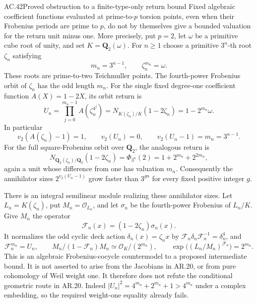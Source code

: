\begin{claim}{AC.42}{Proved obstruction to a finite-type-only return bound}
Fixed algebraic coefficient functions evaluated at prime-to-$p$ torsion
points, even when their Frobenius periods are prime to $p$, do not by
themselves give a bounded valuation for the return unit minus one.
More precisely, put $p=2$, let $\omega$ be a primitive cube root of
unity, and set $K=\mathbf Q_2(\omega)$. For $n\ge1$ choose a primitive
$3^n$-th root $\zeta_n$ satisfying
\[
 m_n=3^{n-1},\qquad \zeta_n^{m_n}=\omega.
\]
These roots are prime-to-two Teichmuller points. The fourth-power
Frobenius orbit of $\zeta_n$ has the odd length $m_n$. For the single
fixed degree-one coefficient function $A(X)=1-2X$, its orbit return is
\[
 U_n=\prod_{j=0}^{m_n-1}A(\zeta_n^{4^j})
     =N_{K(\zeta_n)/K}(1-2\zeta_n)
     =1-2^{m_n}\omega.                              \tag{AC.42.1}
\]
In particular
\[
 v_2(A(\zeta_n)-1)=1,\qquad v_2(U_n)=0,
 \qquad v_2(U_n-1)=m_n=3^{n-1}.                    \tag{AC.42.2}
\]
For the full square-Frobenius orbit over $\mathbf Q_2$, the analogous
return is
\[
 N_{\mathbf Q_2(\zeta_n)/\mathbf Q_2}(1-2\zeta_n)
 =\Phi_{3^n}(2)=1+2^{m_n}+2^{2m_n},                 \tag{AC.42.3}
\]
again a unit whose difference from one has valuation $m_n$.
Consequently the annihilator sizes $2^{v_2(U_n-1)}$ grow faster than
$3^{gn}$ for every fixed positive integer $g$.

There is an integral semilinear module realizing these annihilator
sizes. Let $L_n=K(\zeta_n)$, put $M_n=\mathcal O_{L_n}$, and let
$\sigma_n$ be the fourth-power Frobenius of $L_n/K$. Give $M_n$ the
operator
\[
 \mathcal F_n(x)=(1-2\zeta_n)\sigma_n(x).
\]
It normalizes the odd cyclic deck action $\delta_n(x)=\zeta_nx$ by
$\mathcal F_n\delta_n\mathcal F_n^{-1}=\delta_n^4$, and
\[
 \mathcal F_n^{m_n}=U_n,\qquad
 M_n/(1-\mathcal F_n)M_n
       \simeq\mathcal O_K/(2^{m_n}),\qquad
 \exp\bigl((L_n/M_n)^{\mathcal F_n}\bigr)=2^{m_n}.
                                                        \tag{AC.42.4}
\]
This is an algebraic Frobenius-cocycle countermodel to a proposed
intermediate bound. It is not asserted to arise from the Jacobians
in AR.20, or from pure cohomology of Weil weight one. It therefore
does not refute the conditional geometric route in AR.20.
Indeed $|U_n|^2=4^{m_n}+2^{m_n}+1>4^{m_n}$ under a complex
embedding, so the required weight-one equality already fails.
\end{claim}
